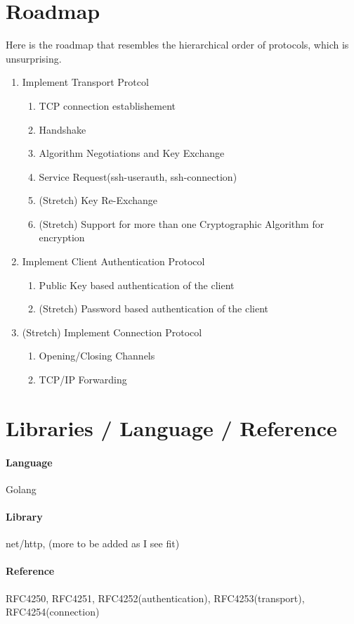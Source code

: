 \documentclass{article} %
\begin{document}
\section{Roadmap} 
Here is the roadmap that resembles the hierarchical order of protocols, which is unsurprising.
\begin{enumerate}
    \item Implement Transport Protcol 
    \begin{enumerate}
        \item TCP connection establishement
        \item Handshake 
        \item Algorithm Negotiations and Key Exchange
        \item Service Request(ssh-userauth, ssh-connection)
        \item (Stretch) Key Re-Exchange
        \item (Stretch) Support for more than one Cryptographic Algorithm for encryption
    \end{enumerate}
    \item Implement Client Authentication Protocol
    \begin{enumerate}
        \item Public Key based authentication of the client
        \item (Stretch) Password based authentication of the client
    \end{enumerate}
    \item (Stretch) Implement Connection Protocol
    \begin{enumerate}
        \item Opening/Closing Channels
        \item TCP/IP Forwarding
    \end{enumerate}
\end{enumerate}

\section{Libraries / Language / Reference}
\paragraph*{Language}
Golang
\paragraph*{Library}
net/http, (more to be added as I see fit)
\paragraph*{Reference}
RFC4250, RFC4251, RFC4252(authentication), RFC4253(transport), RFC4254(connection)
\end{document}
